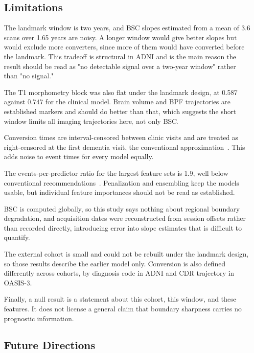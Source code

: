 \documentclass[blue]{ludusofficial}  %
\begin{document}
\subsection{Limitations}

The landmark window is two years, and BSC slopes estimated from a mean of 3.6 scans over 1.65 years are noisy. A longer window would give better slopes but would exclude more converters, since more of them would have converted before the landmark. This tradeoff is structural in ADNI and is the main reason the result should be read as "no detectable signal over a two-year window" rather than "no signal."

The T1 morphometry block was also flat under the landmark design, at 0.587 against 0.747 for the clinical model. Brain volume and BPF trajectories are established markers and should do better than that, which suggests the short window limits all imaging trajectories here, not only BSC.

Conversion times are interval-censored between clinic visits and are treated as right-censored at the first dementia visit, the conventional approximation~\cite{zhang2024interval}. This adds noise to event times for every model equally.

The events-per-predictor ratio for the largest feature sets is 1.9, well below conventional recommendations~\cite{riley2019minimum}. Penalization and ensembling keep the models usable, but individual feature importances should not be read as established.

BSC is computed globally, so this study says nothing about regional boundary degradation, and acquisition dates were reconstructed from session offsets rather than recorded directly, introducing error into slope estimates that is difficult to quantify.

The external cohort is small and could not be rebuilt under the landmark design, so those results describe the earlier model only. Conversion is also defined differently across cohorts, by diagnosis code in ADNI and CDR trajectory in OASIS-3.

Finally, a null result is a statement about this cohort, this window, and these features. It does not license a general claim that boundary sharpness carries no prognostic information.

\subsection{Future Directions}
\end{document}
